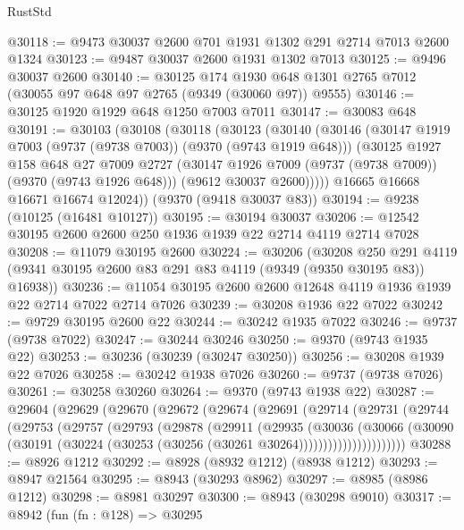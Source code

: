 \begin{lexlean}{RustStd}
\begin{coremodule}
@30118 := @9473 @30037 @2600 @701 @1931 @1302 @291 @2714 @7013 @2600 @1324
@30123 := @9487 @30037 @2600 @1931 @1302 @7013
@30125 := @9496 @30037 @2600
@30140 := @30125
    @174
    @1930
    @648
    @1301
    @2765
    @7012
    (@30055 @97 @648 @97 @2765 (@9349 (@30060 @97)) @9555)
@30146 := @30125 @1920 @1929 @648 @1250 @7003 @7011
@30147 := @30083 @648
@30191 := @30103
    (@30108
      (@30118
        (@30123
          (@30140
            (@30146
              (@30147 @1919 @7003 (@9737 (@9738 @7003)) (@9370 (@9743 @1919 @648)))
              (@30125
                @1927
                @158
                @648
                @27
                @7009
                @2727
                (@30147 @1926 @7009 (@9737 (@9738 @7009)) (@9370 (@9743 @1926 @648)))
                (@9612 @30037 @2600)))))
        @16665
        @16668
        @16671
        @16674
        @12024))
    (@9370 (@9418 @30037 @83))
@30194 := @9238 (@10125 (@16481 @10127))
@30195 := @30194 @30037
@30206 := @12542 @30195 @2600 @2600 @250 @1936 @1939 @22 @2714 @4119 @2714 @7028
@30208 := @11079 @30195 @2600
@30224 := @30206
    (@30208
      @250
      @291
      @4119
      (@9341 @30195 @2600 @83 @291 @83 @4119 (@9349 (@9350 @30195 @83)) @16938))
@30236 := @11054 @30195 @2600 @2600 @12648 @4119 @1936 @1939 @22 @2714 @7022 @2714 @7026
@30239 := @30208 @1936 @22 @7022
@30242 := @9729 @30195 @2600 @22
@30244 := @30242 @1935 @7022
@30246 := @9737 (@9738 @7022)
@30247 := @30244 @30246
@30250 := @9370 (@9743 @1935 @22)
@30253 := @30236 (@30239 (@30247 @30250))
@30256 := @30208 @1939 @22 @7026
@30258 := @30242 @1938 @7026
@30260 := @9737 (@9738 @7026)
@30261 := @30258 @30260
@30264 := @9370 (@9743 @1938 @22)
@30287 := @29604
    (@29629
      (@29670
        (@29672
          (@29674
            (@29691
              (@29714
                (@29731
                  (@29744
                    (@29753
                      (@29757
                        (@29793
                          (@29878
                            (@29911
                              (@29935
                                (@30036
                                  (@30066
                                    (@30090
                                      (@30191
                                        (@30224 (@30253 (@30256 (@30261 @30264))))))))))))))))))))))
@30288 := @8926 @1212
@30292 := @8928 (@8932 @1212) (@8938 @1212)
@30293 := @8947 @21564
@30295 := @8943 (@30293 @8962)
@30297 := @8985 (@8986 @1212)
@30298 := @8981 @30297
@30300 := @8943 (@30298 @9010)
@30317 := @8942
    (fun (fn : @128) =>
    @30295

\end{coremodule}
\end{lexlean}
